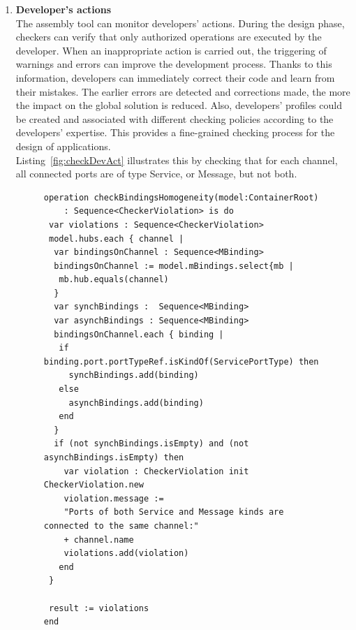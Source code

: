 \vspace{0.75cm}
\begin{enumerate}
\item {\bf Developer's actions}\\
The assembly tool can monitor developers' actions. During the design phase, checkers can verify that only authorized operations are executed by the developer. When an inappropriate action is carried out, the triggering of warnings and errors can improve the development process. Thanks to this information, developers can immediately correct their code and learn from their mistakes. The earlier errors are detected and corrections made, the more the impact on the global solution is reduced. Also, developers' profiles could be created and associated with different checking policies according to the developers' expertise. This provides a fine-grained checking process for the design of applications.\\
Listing~\ref{fig:checkDevAct} illustrates this by checking that for each channel, all connected ports are of type Service, or Message, but not both.

\begin{figure}[h!]
\centering
\begin{lstlisting}[caption=Example checking developpers' actions,label=fig:checkDevAct,basicstyle=\scriptsize\ttfamily,tabsize=1 ]
operation checkBindingsHomogeneity(model:ContainerRoot)
	: Sequence<CheckerViolation> is do
 var violations : Sequence<CheckerViolation>
 model.hubs.each { channel |
  var bindingsOnChannel : Sequence<MBinding>
  bindingsOnChannel := model.mBindings.select{mb |
   mb.hub.equals(channel)
  }
  var synchBindings :  Sequence<MBinding> 
  var asynchBindings : Sequence<MBinding>
  bindingsOnChannel.each { binding | 			
   if binding.port.portTypeRef.isKindOf(ServicePortType) then
     synchBindings.add(binding)
   else
     asynchBindings.add(binding)
   end
  }
  if (not synchBindings.isEmpty) and (not asynchBindings.isEmpty) then
    var violation : CheckerViolation init CheckerViolation.new
    violation.message :=
    "Ports of both Service and Message kinds are connected to the same channel:"
    + channel.name
    violations.add(violation)
   end  			
 }
 		
 result := violations
end
\end{lstlisting}
\vspace{-0,4cm}
\end{figure}

\vspace{0.50cm}


\end{enumerate}
